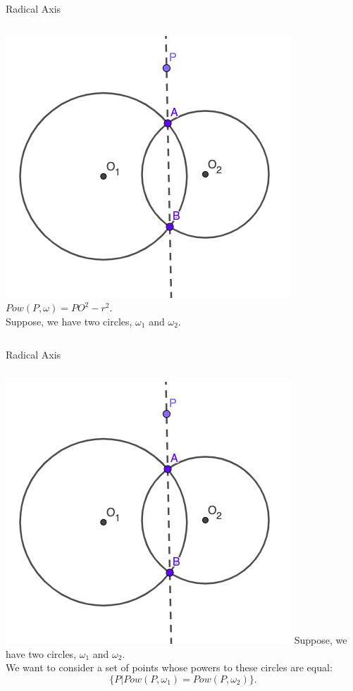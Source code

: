 \documentclass{beamer}
\begin{document}
\begin{frame}{Radical Axis}
	\begin{columns}
		\includegraphics[scale=0.4]{rad1.png}
		$Pow(P, \omega) = PO^2 - r^2$.\\
		\phantom{Spacing}
		Suppose, we have two circles, $\omega_1$ and $\omega_2$.
	\end{columns}
\end{frame}
\begin{frame}{Radical Axis}
	\begin{columns}
		\column{0.6\textwidth}
		\includegraphics[scale=0.4]{rad1.png}
		\column{0.5\textwidth}
		Suppose, we have two circles, $\omega_1$ and $\omega_2$.\\
		We want to consider a set of points whose powers
		to these circles are equal:
		\[
			\{ P | Pow(P, \omega_1) = Pow(P,\omega_2)\}
		.\] 
	\end{columns}
\end{frame}
\end{document}
